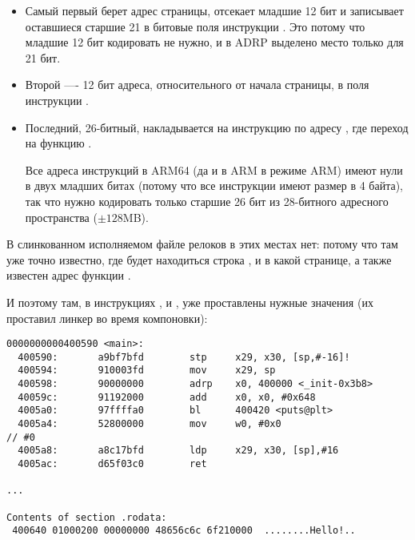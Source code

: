 \begin{itemize}
\item 
Самый первый берет адрес страницы, отсекает младшие 12 бит и записывает оставшиеся старшие 21
в битовые поля инструкции . Это потому что младшие 12 бит кодировать не нужно,
и в ADRP выделено место только для 21 бит.

\item Второй ---- 12 бит адреса, относительного от начала страницы, в поля инструкции \ADD.

\item Последний, 26-битный, накладывается на инструкцию по адресу , где переход на функцию \printf.

Все адреса инструкций в ARM64 (да и в ARM в режиме ARM) имеют нули в двух младших битах
(потому что все инструкции имеют размер в 4 байта),
так что нужно кодировать только старшие 26 бит из 28-битного адресного пространства ($\pm 128$MB).

\end{itemize}

В слинкованном исполняемом файле релоков в этих местах нет: потому что там уже точно известно, 
где будет находиться строка , и в какой странице, а также известен адрес функции \puts.

И поэтому там, в инструкциях , \ADD и , уже проставлены нужные значения 
(их проставил линкер во время компоновки):

\begin{lstlisting}[caption=objdump исполняемого файла,style=customasmARM]
0000000000400590 <main>:
  400590:       a9bf7bfd        stp     x29, x30, [sp,#-16]!
  400594:       910003fd        mov     x29, sp
  400598:       90000000        adrp    x0, 400000 <_init-0x3b8>
  40059c:       91192000        add     x0, x0, #0x648
  4005a0:       97ffffa0        bl      400420 <puts@plt>
  4005a4:       52800000        mov     w0, #0x0                        // #0
  4005a8:       a8c17bfd        ldp     x29, x30, [sp],#16
  4005ac:       d65f03c0        ret

...

Contents of section .rodata:
 400640 01000200 00000000 48656c6c 6f210000  ........Hello!..
\end{lstlisting}



